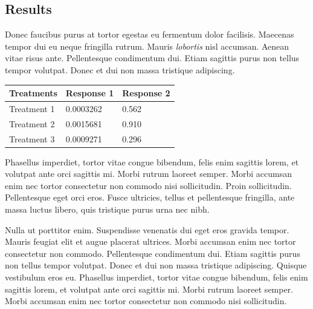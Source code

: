 \documentclass[a0,landscape]{a0poster}
\begin{document}
\begin{multicols}{4}

\section*{Results}

Donec faucibus purus at tortor egestas eu fermentum dolor facilisis. Maecenas tempor dui eu neque fringilla rutrum. Mauris \emph{lobortis} nisl accumsan. Aenean vitae risus ante. Pellentesque condimentum dui. Etiam sagittis purus non tellus tempor volutpat. Donec et dui non massa tristique adipiscing.
%
\begin{table} %
\begin{tabular}{l l l}
\toprule
\textbf{Treatments} & \textbf{Response 1} & \textbf{Response 2}\\
\midrule
Treatment 1 & 0.0003262 & 0.562 \\
Treatment 2 & 0.0015681 & 0.910 \\
Treatment 3 & 0.0009271 & 0.296 \\
\bottomrule
\end{tabular}
\end{table}
%
Phasellus imperdiet, tortor vitae congue bibendum, felis enim sagittis lorem, et volutpat ante orci sagittis mi. Morbi rutrum laoreet semper. Morbi accumsan enim nec tortor consectetur non commodo nisi sollicitudin. Proin sollicitudin. Pellentesque eget orci eros. Fusce ultricies, tellus et pellentesque fringilla, ante massa luctus libero, quis tristique purus urna nec nibh.

Nulla ut porttitor enim. Suspendisse venenatis dui eget eros gravida tempor. Mauris feugiat elit et augue placerat ultrices. Morbi accumsan enim nec tortor consectetur non commodo. Pellentesque condimentum dui. Etiam sagittis purus non tellus tempor volutpat. Donec et dui non massa tristique adipiscing. Quisque vestibulum eros eu. Phasellus imperdiet, tortor vitae congue bibendum, felis enim sagittis lorem, et volutpat ante orci sagittis mi. Morbi rutrum laoreet semper. Morbi accumsan enim nec tortor consectetur non commodo nisi sollicitudin.


\end{multicols}
\end{document}

